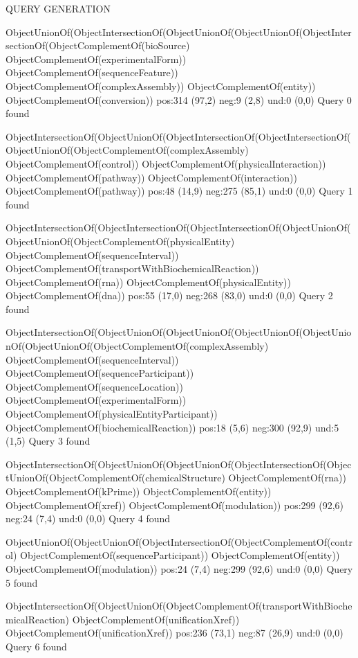QUERY GENERATION

ObjectUnionOf(ObjectIntersectionOf(ObjectUnionOf(ObjectUnionOf(ObjectIntersectionOf(ObjectComplementOf(bioSource) ObjectComplementOf(experimentalForm)) ObjectComplementOf(sequenceFeature)) ObjectComplementOf(complexAssembly)) ObjectComplementOf(entity)) ObjectComplementOf(conversion))
pos:314 (97,2)		 neg:9 (2,8)		 und:0 (0,0)
Query 0 found

ObjectIntersectionOf(ObjectUnionOf(ObjectIntersectionOf(ObjectIntersectionOf(ObjectUnionOf(ObjectComplementOf(complexAssembly) ObjectComplementOf(control)) ObjectComplementOf(physicalInteraction)) ObjectComplementOf(pathway)) ObjectComplementOf(interaction)) ObjectComplementOf(pathway))
pos:48 (14,9)		 neg:275 (85,1)		 und:0 (0,0)
Query 1 found

ObjectIntersectionOf(ObjectIntersectionOf(ObjectIntersectionOf(ObjectUnionOf(ObjectUnionOf(ObjectComplementOf(physicalEntity) ObjectComplementOf(sequenceInterval)) ObjectComplementOf(transportWithBiochemicalReaction)) ObjectComplementOf(rna)) ObjectComplementOf(physicalEntity)) ObjectComplementOf(dna))
pos:55 (17,0)		 neg:268 (83,0)		 und:0 (0,0)
Query 2 found

ObjectIntersectionOf(ObjectUnionOf(ObjectUnionOf(ObjectUnionOf(ObjectUnionOf(ObjectUnionOf(ObjectComplementOf(complexAssembly) ObjectComplementOf(sequenceInterval)) ObjectComplementOf(sequenceParticipant)) ObjectComplementOf(sequenceLocation)) ObjectComplementOf(experimentalForm)) ObjectComplementOf(physicalEntityParticipant)) ObjectComplementOf(biochemicalReaction))
pos:18 (5,6)		 neg:300 (92,9)		 und:5 (1,5)
Query 3 found

ObjectIntersectionOf(ObjectUnionOf(ObjectUnionOf(ObjectIntersectionOf(ObjectUnionOf(ObjectComplementOf(chemicalStructure) ObjectComplementOf(rna)) ObjectComplementOf(kPrime)) ObjectComplementOf(entity)) ObjectComplementOf(xref)) ObjectComplementOf(modulation))
pos:299 (92,6)		 neg:24 (7,4)		 und:0 (0,0)
Query 4 found

ObjectUnionOf(ObjectUnionOf(ObjectIntersectionOf(ObjectComplementOf(control) ObjectComplementOf(sequenceParticipant)) ObjectComplementOf(entity)) ObjectComplementOf(modulation))
pos:24 (7,4)		 neg:299 (92,6)		 und:0 (0,0)
Query 5 found

ObjectIntersectionOf(ObjectUnionOf(ObjectComplementOf(transportWithBiochemicalReaction) ObjectComplementOf(unificationXref)) ObjectComplementOf(unificationXref))
pos:236 (73,1)		 neg:87 (26,9)		 und:0 (0,0)
Query 6 found

